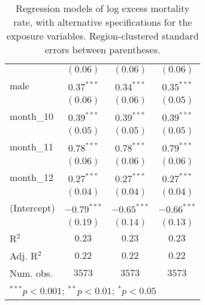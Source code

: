 \begin{table}
\begin{center}
\begin{tabular}{l c c c}
                    & $(0.06)$      & $(0.06)$      & $(0.06)$      \\
male                & $0.37^{***}$  & $0.34^{***}$  & $0.35^{***}$  \\
                    & $(0.06)$      & $(0.06)$      & $(0.05)$      \\
month\_10           & $0.39^{***}$  & $0.39^{***}$  & $0.39^{***}$  \\
                    & $(0.05)$      & $(0.05)$      & $(0.05)$      \\
month\_11           & $0.78^{***}$  & $0.78^{***}$  & $0.79^{***}$  \\
                    & $(0.06)$      & $(0.06)$      & $(0.06)$      \\
month\_12           & $0.27^{***}$  & $0.27^{***}$  & $0.27^{***}$  \\
                    & $(0.04)$      & $(0.04)$      & $(0.04)$      \\
(Intercept)         & $-0.79^{***}$ & $-0.65^{***}$ & $-0.66^{***}$ \\
                    & $(0.19)$      & $(0.14)$      & $(0.13)$      \\
\hline
R$^2$               & $0.23$        & $0.23$        & $0.23$        \\
Adj. R$^2$          & $0.22$        & $0.22$        & $0.22$        \\
Num. obs.           & $3573$        & $3573$        & $3573$        \\
\hline
\multicolumn{4}{l}{\scriptsize{$^{***}p<0.001$; $^{**}p<0.01$; $^{*}p<0.05$}}
\end{tabular}
\caption{Regression models of log excess mortality rate, with alternative specifications for the exposure variables. Region-clustered standard errors between parentheses.}
\label{tab:altspecmodels}
\end{center}
\end{table}
